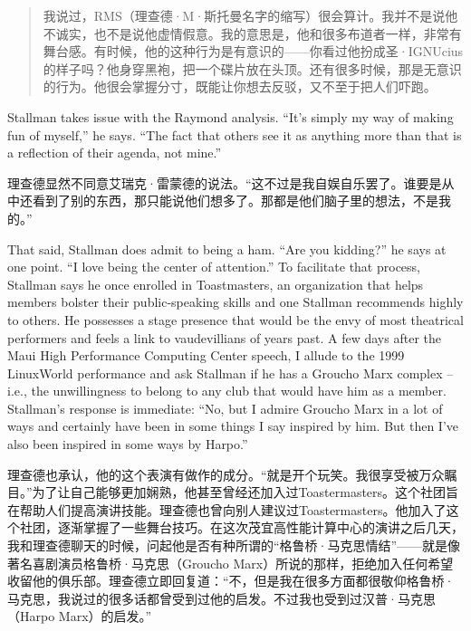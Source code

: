 \ifdefined\chs
\begin{quote}
我说过，RMS（理查德·M·斯托曼名字的缩写）很会算计。我并不是说他不诚实，也不是说他虚情假意。我的意思是，他和很多布道者一样，非常有舞台感。有时候，他的这种行为是有意识的——你看过他扮成圣·IGNUcius的样子吗？他身穿黑袍，把一个碟片放在头顶。还有很多时候，那是无意识的行为。他很会掌握分寸，既能让你想去反驳，又不至于把人们吓跑。
\end{quote}
\fi

\ifdefined\eng
Stallman takes issue with the Raymond analysis. ``It's simply my way of making fun of myself,'' he says. ``The fact that others see it as anything more than that is a reflection of their agenda, not mine.''
\fi

\ifdefined\chs
理查德显然不同意艾瑞克·雷蒙德的说法。“这不过是我自娱自乐罢了。谁要是从中还看到了别的东西，那只能说他们想多了。那都是他们脑子里的想法，不是我的。”
\fi

\ifdefined\eng
That said, Stallman does admit to being a ham. ``Are you kidding?'' he says at one point. ``I love being the center of attention.'' To facilitate that process, Stallman says he once enrolled in Toastmasters, an organization that helps members bolster their public-speaking skills and one Stallman recommends highly to others. He possesses a stage presence that would be the envy of most theatrical performers and feels a link to vaudevillians of years past. A few days after the Maui High Performance Computing Center speech, I allude to the 1999 LinuxWorld performance and ask Stallman if he has a Groucho Marx complex -- i.e., the unwillingness to belong to any club that would have him as a member. Stallman's response is immediate: ``No, but I admire Groucho Marx in a lot of ways and certainly have been in some things I say inspired by him. But then I've also been inspired in some ways by Harpo.''
\fi

\ifdefined\chs
理查德也承认，他的这个表演有做作的成分。“就是开个玩笑。我很享受被万众瞩目。”为了让自己能够更加娴熟，他甚至曾经还加入过Toastermasters。这个社团旨在帮助人们提高演讲技能。理查德也曾向别人建议过Toastermasters。他加入了这个社团，逐渐掌握了一些舞台技巧。在这次茂宜高性能计算中心的演讲之后几天，我和理查德聊天的时候，问起他是否有种所谓的“格鲁桥·马克思情结”——就是像著名喜剧演员格鲁桥·马克思（Groucho Marx）所说的那样，拒绝加入任何希望收留他的俱乐部。理查德立即回复道：“不，但是我在很多方面都很敬仰格鲁桥·马克思，我说过的很多话都曾受到过他的启发。不过我也受到过汉普·马克思（Harpo Marx）的启发。”
\fi

